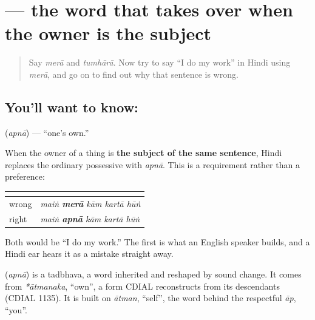 \section[\texorpdfstring{\hi{अपना} (apnā)}{अपना (apnā)}]{ — the word that takes over when the owner is the subject}

\label{lesson:HI-C84-apna}



\begin{quote}
Say \emph{merā} and \emph{tumhārā}. Now try to say \textquotedblleft{}I do my work\textquotedblright{} in Hindi using \emph{merā}, and go on to find out why that sentence is wrong.
\end{quote}

\subsection*{You'll want to know: }
\textbf{} (\emph{apnā}) — \textquotedblleft{}one's own.\textquotedblright{}

When the owner of a thing is \textbf{the subject of the same sentence}, Hindi replaces the ordinary possessive with \emph{apnā}. This is a requirement rather than a preference:

\noindent
\begin{tabularx}{\linewidth}{@{}>{\raggedright\arraybackslash}X>{\raggedright\arraybackslash}X@{}}
\toprule
\textbf{} & \textbf{} \\
\midrule
wrong & \emph{maiṅ \textbf{merā} kām kartā hūṅ} \\
right & \emph{maiṅ \textbf{apnā} kām kartā hūṅ} \\
\bottomrule
\end{tabularx}

Both would be \textquotedblleft{}I do my work.\textquotedblright{} The first is what an English speaker builds, and a Hindi ear hears it as a mistake straight away.

\begin{cousinweb}
\textbf{} (\emph{apnā}) is a tadbhava, a word inherited and reshaped by sound change. It comes from \emph{*ātmanaka}, \textquotedblleft{}own\textquotedblright{}, a form CDIAL reconstructs from its descendants (CDIAL 1135). It is built on \emph{ātman}, \textquotedblleft{}self\textquotedblright{}, the word behind the respectful \emph{āp}, \textquotedblleft{}you\textquotedblright{}.
\end{cousinweb}


